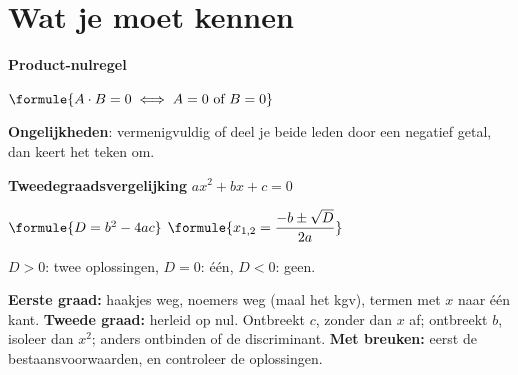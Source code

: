 %



\section{Wat je moet kennen}

\begin{theorie}
\begin{minipage}[t]{.47\linewidth}
\vspace{0pt}
\textbf{\textcolor{accent}{Product-nulregel}}

\vspace{1mm}
$\formule{A \cdot B = 0 \iff A = 0 \text{ of } B = 0}$

\vspace{2mm}
\textbf{\textcolor{accent}{Ongelijkheden}}: vermenigvuldig of deel je beide leden door een negatief getal, dan keert het teken om.
\end{minipage}\hfill
\begin{minipage}[t]{.5\linewidth}
\vspace{0pt}
\textbf{\textcolor{accent}{Tweedegraadsvergelijking}} $ax^2 + bx + c = 0$

\vspace{1mm}
$\formule{D = b^2 - 4ac}$ \qquad $\formule{x_{1,2} = \dfrac{-b \pm \sqrt D}{2a}}$

\vspace{1mm}
$D > 0$: twee oplossingen, $D = 0$: één, $D < 0$: geen.
\end{minipage}
\end{theorie}

\begin{werkwijze}
\textbf{Eerste graad:} haakjes weg, noemers weg (maal het kgv), termen met $x$ naar één kant. \textbf{Tweede graad:} herleid op nul. Ontbreekt $c$, zonder dan $x$ af; ontbreekt $b$, isoleer dan $x^2$; anders ontbinden of de discriminant. \textbf{Met breuken:} eerst de bestaansvoorwaarden, en controleer de oplossingen.
\end{werkwijze}

